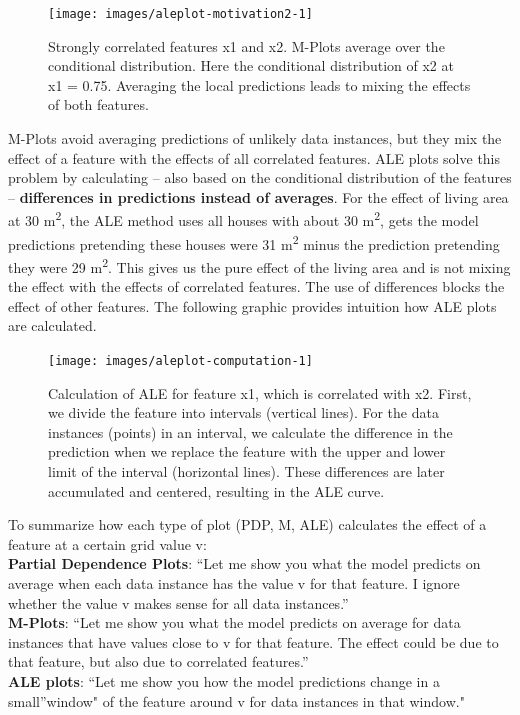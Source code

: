 \documentclass[
  12pt,
]{krantz}
\begin{document}
\begin{figure}

{\centering \texttt{[image: images/aleplot-motivation2-1]} 

}

\caption{Strongly correlated features x1 and x2. M-Plots average over the conditional distribution. Here the conditional distribution of x2 at x1 = 0.75. Averaging the local predictions leads to mixing the effects of both features.}\label{fig:aleplot-motivation2}
\end{figure}

M-Plots avoid averaging predictions of unlikely data instances, but they mix the effect of a feature with the effects of all correlated features.
ALE plots solve this problem by calculating -- also based on the conditional distribution of the features -- \textbf{differences in predictions instead of averages}.
For the effect of living area at 30 m\textsuperscript{2}, the ALE method uses all houses with about 30 m\textsuperscript{2}, gets the model predictions pretending these houses were 31 m\textsuperscript{2} minus the prediction pretending they were 29 m\textsuperscript{2}.
This gives us the pure effect of the living area and is not mixing the effect with the effects of correlated features.
The use of differences blocks the effect of other features.
The following graphic provides intuition how ALE plots are calculated.

\begin{figure}

{\centering \texttt{[image: images/aleplot-computation-1]} 

}

\caption{Calculation of ALE for feature x1, which is correlated with x2. First, we divide the feature into intervals (vertical lines). For the data instances (points) in an interval, we calculate the difference in the prediction when we replace the feature with the upper and lower limit of the interval (horizontal lines). These differences are later accumulated and centered, resulting in the ALE curve.}\label{fig:aleplot-computation}
\end{figure}

To summarize how each type of plot (PDP, M, ALE) calculates the effect of a feature at a certain grid value v:\\
\textbf{Partial Dependence Plots}: ``Let me show you what the model predicts on average when each data instance has the value v for that feature.
I ignore whether the value v makes sense for all data instances.''\\
\textbf{M-Plots}: ``Let me show you what the model predicts on average for data instances that have values close to v for that feature.
The effect could be due to that feature, but also due to correlated features.''\\
\textbf{ALE plots}: ``Let me show you how the model predictions change in a small''window" of the feature around v for data instances in that window."
\end{document}
